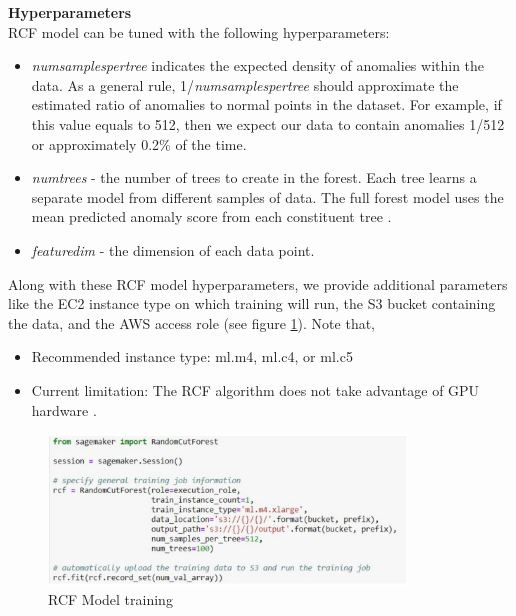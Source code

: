     \textbf{Hyperparameters}\\
    RCF model can be tuned with the following hyperparameters:
    \begin{itemize}
        \item \textit{num\textunderscore samples\textunderscore per\textunderscore tree} indicates the expected density of anomalies within the data. As a general rule, 1/\textit{num\textunderscore samples\textunderscore per\textunderscore tree} should approximate the estimated ratio of anomalies to normal points in the dataset. For example, if this value equals to 512, then we expect our data to contain anomalies 1/512 or approximately 0.2\% of the time.
   
        \item \textit{num\textunderscore trees} - the number of trees to create in the forest. Each tree learns a separate model from different samples of data. The full forest model uses the mean predicted anomaly score from each constituent tree \cite{awsRcfSagemaker}.
        \item \textit{feature\textunderscore dim} - the dimension of each data point.
    \end{itemize}
    Along with these RCF model hyperparameters, we provide additional parameters like the EC2 instance type on which training will run, the S3 bucket containing the data, and the AWS access role (see figure \ref{fig:rcf_model_training}). Note that,
    \begin{itemize}
        \item Recommended instance type: ml.m4, ml.c4, or ml.c5
        \item Current limitation: The RCF algorithm does not take advantage of GPU hardware \cite{awsRcfSagemaker}.
    \end{itemize}
    \begin{figure}[h]
        \centering
        \includegraphics[width=0.85\textwidth]{images/rcf-model-training.png}
        \caption{RCF Model training}
        \label{fig:rcf_model_training}
    \end{figure}
    \FloatBarrier
    
